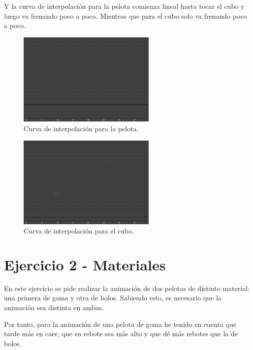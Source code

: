 \documentclass{article}
\begin{document}
Y la curva de interpolación para la pelota comienza lineal hasta tocar el cubo y luego va frenando poco a poco. Mientras que para el cubo solo va frenando poco a poco.

\bigskip

\begin{figure}[H]
    \centering
    \includegraphics[width=0.6\textwidth]{imagenes/Ejercicio 1/curva_p2.png}
    \caption{Curva de interpolación para la pelota.}
\end{figure}

\begin{figure}[H]
    \centering
    \includegraphics[width=0.6\textwidth]{imagenes/Ejercicio 1/curva_c2.png}
    \caption{Curva de interpolación para el cubo.}
\end{figure}


\section{Ejercicio 2 - Materiales}

En este ejercicio se pide realizar la animación de dos pelotas de distinto material: una primera de goma y otra de bolos. Sabiendo esto, es necesario que la animación sea distinta en ambas.

\bigskip

Por tanto, para la animación de una pelota de goma he tenido en cuenta que tarde más en caer, que su rebote sea más alto y que dé más rebotes que la de bolos.
\end{document}

